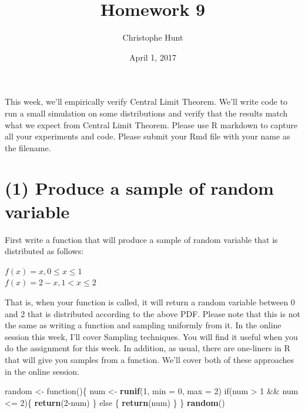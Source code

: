 \documentclass[]{article}
\title{Homework 9}
\author{Christophe Hunt}
\date{April 1, 2017}
\newenvironment{Shaded}{\begin{snugshade}}{\end{snugshade}}
\newcommand{\KeywordTok}[1]{\textcolor[rgb]{0.13,0.29,0.53}{\textbf{{#1}}}}
\newcommand{\DataTypeTok}[1]{\textcolor[rgb]{0.13,0.29,0.53}{{#1}}}
\newcommand{\DecValTok}[1]{\textcolor[rgb]{0.00,0.00,0.81}{{#1}}}
\newcommand{\StringTok}[1]{\textcolor[rgb]{0.31,0.60,0.02}{{#1}}}
\newcommand{\NormalTok}[1]{{#1}}
\begin{document}
\maketitle

{
\setcounter{tocdepth}{2}
\tableofcontents
}
This week, we'll empirically verify Central Limit Theorem. We'll write
code to run a small simulation on some distributions and verify that the
results match what we expect from Central Limit Theorem. Please use R
markdown to capture all your experiments and code. Please submit your
Rmd file with your name as the filename.

\newpage

\section{(1) Produce a sample of random
variable}\label{produce-a-sample-of-random-variable}

First write a function that will produce a sample of random variable
that is distributed as follows:

\(f(x) = x, 0 \leq x \leq 1\)\\
\(f(x) = 2 - x, 1 < x \leq 2\)

That is, when your function is called, it will return a random variable
between 0 and 2 that is distributed according to the above PDF. Please
note that this is not the same as writing a function and sampling
uniformly from it. In the online session this week, I'll cover Sampling
techniques. You will find it useful when you do the assignment for this
week. In addition, as usual, there are one-liners in R that will give
you samples from a function. We'll cover both of these approaches in the
online session.

\begin{Shaded}
\begin{Highlighting}[]
\NormalTok{random <-}\StringTok{ }\NormalTok{function()\{}
          \NormalTok{num <-}\StringTok{ }\KeywordTok{runif}\NormalTok{(}\DecValTok{1}\NormalTok{, }\DataTypeTok{min =} \DecValTok{0}\NormalTok{, }\DataTypeTok{max =} \DecValTok{2}\NormalTok{) }
          \NormalTok{if(num >}\StringTok{ }\DecValTok{1} \NormalTok{&&}\StringTok{ }\NormalTok{num <=}\StringTok{ }\DecValTok{2}\NormalTok{)\{}
             \KeywordTok{return}\NormalTok{(}\DecValTok{2}\NormalTok{-num)}
            \NormalTok{\} else \{}
              \KeywordTok{return}\NormalTok{(num)}
            \NormalTok{\}}
          \NormalTok{\} }
\KeywordTok{random}\NormalTok{()}
\end{Highlighting}
\end{Shaded}
\end{document}
